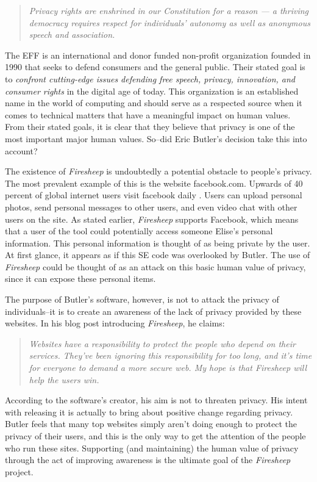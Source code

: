 \documentclass[11pt]{article}
\begin{document}
\begin{multicols}{2}
\begin{quote}
  \emph{Privacy rights are enshrined in our Constitution for a reason — a thriving democracy requires respect for individuals' autonomy as well as anonymous speech and association.} \cite{eff_privacy}
\end{quote}

The EFF is an international and donor funded non-profit organization founded in 1990 that seeks to defend consumers and the general public. Their stated goal is to \emph{confront cutting-edge issues defending free speech, privacy, innovation, and consumer rights} \cite{eff_about} in the digital age of today. This organization is an established name in the world of computing and should serve as a respected source when it comes to technical matters that have a meaningful impact on human values. From their stated goals, it is clear that they believe that privacy is one of the most important major human values. So--did Eric Butler's decision take this into account?

The existence of \emph{Firesheep} is undoubtedly a potential obstacle to people's privacy. The most prevalent example of this is the website facebook.com. Upwards of 40 percent of global internet users visit facebook daily \cite{alexa}. Users can upload personal photos, send personal messages to other users, and even video chat with other users on the site. As stated earlier, \emph{Firesheep} supports Facebook, which means that a user of the tool could potentially access someone Elise's personal information. This personal information is thought of as being private by the user. At first glance, it appears as if this SE code was overlooked by Butler. The use of \emph{Firesheep} could be thought of as an attack on this basic human value of privacy, since it can expose these personal items.

The purpose of Butler's software, however, is not to attack the privacy of individuals--it is to create an awareness of the lack of privacy provided by these websites. In his blog post introducing \emph{Firesheep}, he claims:

\begin{quote}
\emph{Websites have a responsibility to protect the people who depend on their services. They've been ignoring this responsibility for too long, and it's time for everyone to demand a more secure web. My hope is that Firesheep will help the users win.} \cite{codebutler_main}
\end{quote}

According to the software's creator, his aim is not to threaten privacy. His intent with releasing it is actually to bring about positive change regarding privacy. Butler feels that many top websites simply aren't doing enough to protect the privacy of their users, and this is the only way to get the attention of the people who run these sites. Supporting (and maintaining) the human value of privacy through the act of improving awareness is the ultimate goal of the \emph{Firesheep} project.


\end{multicols}
\end{document}
